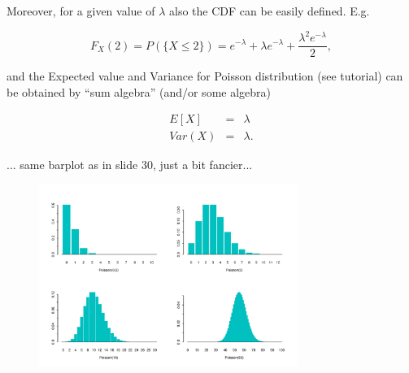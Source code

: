 \documentclass[smaller, handout]{beamer}\usepackage[]{graphicx}\usepackage[]{color}
\renewcommand{\Pr}{P}
\begin{document}
\begin{frame}{\secname}%



Moreover, for a given value of $\lambda $ also the CDF can be easily defined. E.g.

\begin{equation*}
F_X(2)=\Pr \left( \{X\leq 2\}\right) =e^{-\lambda }+\lambda e^{-\lambda }+\frac{\lambda
^{2}e^{-\lambda }}{2},
\end{equation*}

and the Expected value and Variance for Poisson distribution (see tutorial) can be obtained by ``sum algebra'' (and/or some algebra)

\begin{eqnarray*}
E\left[ X\right] &=&\lambda \\
Var\left( X\right) &=&\lambda.
\end{eqnarray*}

\end{frame}%


\begin{frame}{\secname}%


... same barplot as in slide 30, just a bit fancier...

\begin{figure}[ptb]\centering
\includegraphics[width=0.75\textwidth]{img/distpois.pdf}
\end{figure}

\end{frame}%
\end{document}
